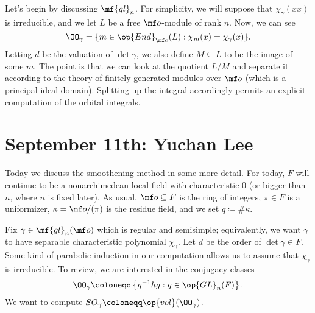 \documentclass{article}
\begin{document}
Let's begin by discussing $\mf{gl}_n$. For simplicity, we will suppose that $\chi_\gamma(xx)$ is irreducible, and we let $L$ be a free $\mf o$-module of rank $n$. Now, we can see
\[\OO_\gamma=\{m\in\op{End}_{\mf o}(L):\chi_m(x)=\chi_\gamma(x)\}.\]
Letting $d$ be the valuation of $\det\gamma$, we also define $M\subseteq L$ to be the image of some $m$. The point is that we can look at the quotient $L/M$ and separate it according to the theory of finitely generated modules over $\mf o$ (which is a principal ideal domain). Splitting up the integral accordingly permits an explicit computation of the orbital integrals.

\section{September 11th: Yuchan Lee}
Today we discuss the smoothening method in some more detail. For today, $F$ will continue to be a nonarchimedean local field with characteristic $0$ (or bigger than $n$, where $n$ is fixed later). As usual, $\mf o\subseteq F$ is the ring of integers, $\pi\in F$ is a uniformizer, $\kappa=\mf o/(\pi)$ is the residue field, and we set $q\coloneqq\#\kappa$.

Fix $\gamma\in\mf{gl}_n(\mf o)$ which is regular and semisimple; equivalently, we want $\gamma$ to have separable characteristic polynomial $\chi_\gamma$. Let $d$ be the order of $\det\gamma\in F$. Some kind of parabolic induction in our computation allows us to assume that $\chi_\gamma$ is irreducible. To review, we are interested in the conjugacy classes
\[\OO_\gamma\coloneqq\left\{g^{-1}hg:g\in\op{GL}_n(F)\right\}.\]
We want to compute $SO_\gamma\coloneqq\op{vol}(\OO_\gamma)$.

\end{document}
